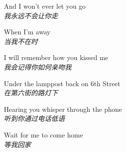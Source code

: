 \begin{spacing}{1.5}
\begin{flushleft}
And I won't ever let you go\\
\textit{我永远不会让你走}\lyricspace

When I'm away\\
\textit{当我不在时}\lyricspace

I will remember how you kissed me\\
\textit{我会记得你如何亲吻我}\lyricspace

Under the lamppost back on 6th Street\\
\textit{在第六街的路灯下}\lyricspace

Hearing you whisper through the phone\\
\textit{听到你通过电话低语}\lyricspace

Wait for me to come home\\
\textit{等我回家}\lyricspace
\end{flushleft}
\end{spacing} 
